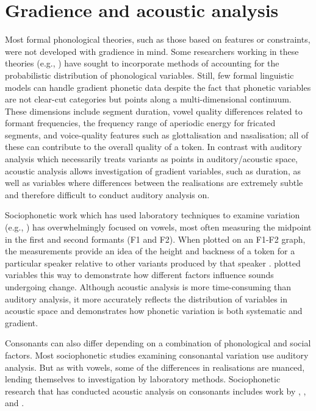 \section{Gradience and acoustic analysis}\label{sec:acoustic}
Most formal phonological theories, such as those based on features or constraints, were not developed with gradience in mind. Some researchers working in these theories (e.g., \citealt{boersma1997}) have sought to incorporate methods of accounting for the probabilistic distribution of phonological variables. Still, few formal linguistic models can handle gradient phonetic data despite the fact that phonetic variables are not clear-cut categories but points along a multi-dimensional continuum. These dimensions include segment duration, vowel quality differences related to formant frequencies, the frequency range of aperiodic energy for fricated segments, and voice-quality features such as glottalisation and nasalisation; all of these can contribute to the overall quality of a token. In contrast with auditory analysis which necessarily treats variants as points in auditory/acoustic space, acoustic analysis allows investigation of gradient variables, such as duration, as well as variables where differences between the realisations are extremely subtle and therefore difficult to conduct auditory analysis on.   

Sociophonetic work which has used laboratory techniques to examine variation (e.g., \citealt{labov2001,labov2005}) has overwhelmingly focused on vowels, most often measuring the midpoint in the first and second formants (F1 and F2). When plotted on an F1-F2 graph, the measurements provide an idea of the height and backness of a token for a particular speaker relative to other variants produced by that speaker \citep[182-184]{petersonbarney1952}. \citet[466-497]{labov2001} plotted variables this way to demonstrate how different factors influence sounds undergoing change. Although acoustic analysis is more time-consuming than auditory analysis, it more accurately reflects the distribution of variables in acoustic space and demonstrates how phonetic variation is both systematic and gradient.  

Consonants can also differ depending on a combination of phonological and social factors. Most sociophonetic studies examining consonantal variation use auditory analysis. But as with vowels, some of the differences in realisations are nuanced, lending themselves to investigation by laboratory methods. Sociophonetic research that has conducted acoustic analysis on consonants includes work by \citet{haymaclagan2010}, \citet{dochertyfoulkes1999}, and \citet{foulkesdochertywatt2005}.

